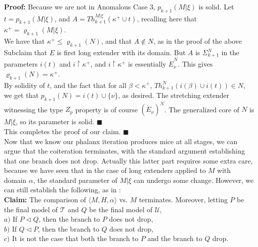 \documentclass[12pt]{article}
\begin{document}
\indent \indent \textbf{Proof:}  Because we are not in Anomalous Case 3, $p_{k+1} (M | \xi)$ is solid.  Let $t = p_{k+1} (M | \xi)$, and $A = Th_{k+1}^{M | \xi} (\kappa^+ \cup t)$, recalling here that $\kappa^+ = \varrho_{k+1} (M | \xi)$.\\

We have that $\kappa^+ \leq \varrho_{k+1} (N)$, and that $A \notin N$, as in the proof of the above Subclaim that $E$ is first long extender with its domain.  But $A$ is $\Sigma_{k+1}^N$ in the parameters $i(t)$ and $i \restriction \kappa^+$, and $i \restriction \kappa^+$ is essentially $\dot{E}_\nu^N$.  This gives $\varrho_{k+1} (N) = \kappa^+$.\\

By solidity of $t$, and the fact that for all $\beta < \kappa^+$, $Th_{k+1}^N (i (\beta) \cup i (t)) \in N$, we get that $p_{k+1} (N) = i (t) \cup \{ \nu \}$, as desired.  The stretching extender witnessing the type $Z_p$ property is of course $(\dot{E}_\nu )^N$.  The generalized core of $N$ is $M | \xi$, so its parameter is solid. $\blacksquare$\\

This completes the proof of our claim. $\blacksquare$\\



Now that we know our phalanx iteration produces mice at all stages, we can argue that the coiteration terminates, with the standard argument establishing that one branch does not drop.  Actually this latter part requires some extra care, because we have seen that in the case of long extenders applied to $M$ with domain $\alpha$, the standard parameter of $M | \xi$ can undergo some change.  However, we can still establish the following, as in \cite{FSPIPM}:\\

\textbf{Claim:}  The comparison of $\langle M, H, \alpha \rangle$ vs. $M$ terminates.  Moreover, letting $P$ be the final model of $\mathscr{T}$ and $Q$ be the final model of $\mathscr{U}$,\\

\indent $a)$ If $P \lhd Q$, then the branch to $P$ does not drop,\\

\indent $b)$ If $Q \lhd P$, then the branch to $Q$ does not drop,\\

\indent $c)$ It is not the case that both the branch to $P$ and the branch to $Q$ drop.\\
\end{document}
